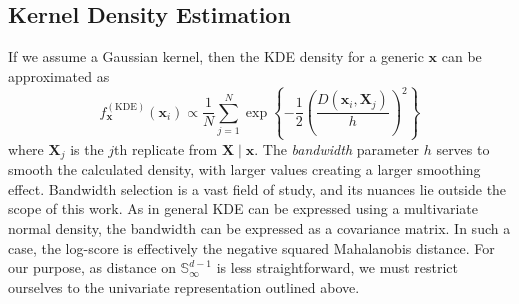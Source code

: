 
\subsection{Kernel Density Estimation}

If we assume a Gaussian kernel, then the KDE density for a generic $\bm{x}$ can 
    be approximated as 
    \begin{equation}
        \label{eq:ad_kde}
        f_{\bm{x}}^{(\text{KDE})}(\bm{x}_i) \propto 
        \frac{1}{N}\sum_{j = 1}^{N}\exp
        \left\lbrace-\frac{1}{2}\left(
        \frac{D(\bm{x}_i,\bm{X}_j)}{h}\right)^2\right\rbrace
    \end{equation}
    where $\bm{X}_j$ is the $j$th 
    replicate from $\bm{X}\mid\bm{x}$.  The \emph{bandwidth} parameter $h$ 
    serves to smooth the calculated density, with larger values creating a 
    larger smoothing effect.  Bandwidth selection is a vast field of study, and 
    its nuances lie outside the scope of this work.  As in general KDE can be 
    expressed using a multivariate normal density, the bandwidth can be 
    expressed as a covariance matrix.  In such a case, the log-score is 
    effectively the negative squared Mahalanobis distance.  For our purpose, as 
    distance on $\mathbb{S}_{\infty}^{d-1}$ is less straightforward, we must 
    restrict ourselves to the univariate representation outlined above.

